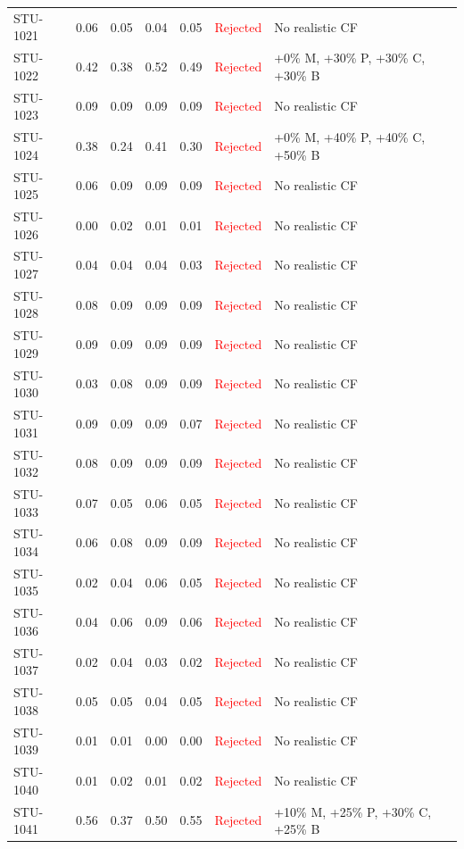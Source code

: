\begin{longtable}{l c c c c | c | l}
STU-1021 & 0.06 & 0.05 & 0.04 & 0.05 & \textcolor{red}{Rejected} & No realistic CF \\
STU-1022 & 0.42 & 0.38 & 0.52 & 0.49 & \textcolor{red}{Rejected} & +0\% M, +30\% P, +30\% C, +30\% B \\
STU-1023 & 0.09 & 0.09 & 0.09 & 0.09 & \textcolor{red}{Rejected} & No realistic CF \\
STU-1024 & 0.38 & 0.24 & 0.41 & 0.30 & \textcolor{red}{Rejected} & +0\% M, +40\% P, +40\% C, +50\% B \\
STU-1025 & 0.06 & 0.09 & 0.09 & 0.09 & \textcolor{red}{Rejected} & No realistic CF \\
STU-1026 & 0.00 & 0.02 & 0.01 & 0.01 & \textcolor{red}{Rejected} & No realistic CF \\
STU-1027 & 0.04 & 0.04 & 0.04 & 0.03 & \textcolor{red}{Rejected} & No realistic CF \\
STU-1028 & 0.08 & 0.09 & 0.09 & 0.09 & \textcolor{red}{Rejected} & No realistic CF \\
STU-1029 & 0.09 & 0.09 & 0.09 & 0.09 & \textcolor{red}{Rejected} & No realistic CF \\
STU-1030 & 0.03 & 0.08 & 0.09 & 0.09 & \textcolor{red}{Rejected} & No realistic CF \\
STU-1031 & 0.09 & 0.09 & 0.09 & 0.07 & \textcolor{red}{Rejected} & No realistic CF \\
STU-1032 & 0.08 & 0.09 & 0.09 & 0.09 & \textcolor{red}{Rejected} & No realistic CF \\
STU-1033 & 0.07 & 0.05 & 0.06 & 0.05 & \textcolor{red}{Rejected} & No realistic CF \\
STU-1034 & 0.06 & 0.08 & 0.09 & 0.09 & \textcolor{red}{Rejected} & No realistic CF \\
STU-1035 & 0.02 & 0.04 & 0.06 & 0.05 & \textcolor{red}{Rejected} & No realistic CF \\
STU-1036 & 0.04 & 0.06 & 0.09 & 0.06 & \textcolor{red}{Rejected} & No realistic CF \\
STU-1037 & 0.02 & 0.04 & 0.03 & 0.02 & \textcolor{red}{Rejected} & No realistic CF \\
STU-1038 & 0.05 & 0.05 & 0.04 & 0.05 & \textcolor{red}{Rejected} & No realistic CF \\
STU-1039 & 0.01 & 0.01 & 0.00 & 0.00 & \textcolor{red}{Rejected} & No realistic CF \\
STU-1040 & 0.01 & 0.02 & 0.01 & 0.02 & \textcolor{red}{Rejected} & No realistic CF \\
STU-1041 & 0.56 & 0.37 & 0.50 & 0.55 & \textcolor{red}{Rejected} & +10\% M, +25\% P, +30\% C, +25\% B \\

\end{longtable}
